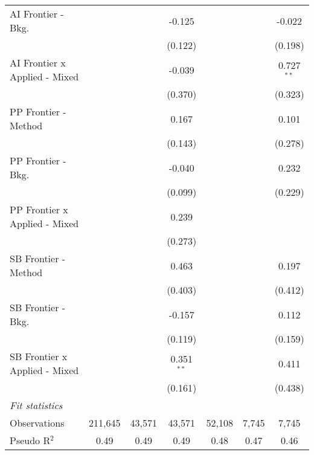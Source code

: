 \begin{tabular}{lcccccc}
   AI Frontier - Bkg.            &               &              & -0.125       &               &               & -0.022\\   
                                 &               &              & (0.122)      &               &               & (0.198)\\   
   AI Frontier x Applied - Mixed &               &              & -0.039       &               &               & 0.727$^{**}$\\   
                                 &               &              & (0.370)      &               &               & (0.323)\\   
   PP Frontier - Method          &               &              & 0.167        &               &               & 0.101\\   
                                 &               &              & (0.143)      &               &               & (0.278)\\   
   PP Frontier - Bkg.            &               &              & -0.040       &               &               & 0.232\\   
                                 &               &              & (0.099)      &               &               & (0.229)\\   
   PP Frontier x Applied - Mixed &               &              & 0.239        &               &               &   \\   
                                 &               &              & (0.273)      &               &               &   \\   
   SB Frontier - Method          &               &              & 0.463        &               &               & 0.197\\   
                                 &               &              & (0.403)      &               &               & (0.412)\\   
   SB Frontier - Bkg.            &               &              & -0.157       &               &               & 0.112\\   
                                 &               &              & (0.119)      &               &               & (0.159)\\   
   SB Frontier x Applied - Mixed &               &              & 0.351$^{**}$ &               &               & 0.411\\   
                                 &               &              & (0.161)      &               &               & (0.438)\\   
   \midrule
   \emph{Fit statistics}\\
   Observations                  & 211,645       & 43,571       & 43,571       & 52,108        & 7,745         & 7,745\\  
   Pseudo R$^2$                  & 0.49          & 0.49         & 0.49         & 0.48          & 0.47          & 0.46\\  
   

\end{tabular}
